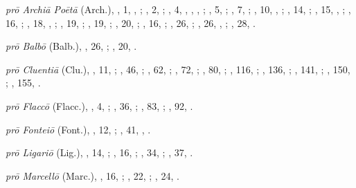 \begin{autindex}
  \subitem \emph{prō Archiā Poētā} (Arch.),
    ,  1, , ;
    ,  2, ;
    ,  4, , , , ;
    ,  5, ;
    ,  7, ;
    , 10, , ;
    , 14, ;
    , 15, , ;
    , 16, ;
    , 18, , ;
    , 19, ;
    , 19, ;
    , 20, ;
    , 16, ;
    , 26, ;
    , 26, , ;
    , 28, .

  \subitem \emph{prō Balbō} (Balb.),
    , 26, ;
    , 20, .

  \subitem \emph{prō Cluentiā} (Clu.),
    ,  11, ;
    ,  46, ;
    ,  62, ;
    ,  72, ;
    ,  80, ;
    , 116, ;
    , 136, ;
    , 141, ;
    , 150, ;
    , 155, .

  \subitem \emph{prō Flaccō} (Flacc.),
    ,  4, ;
    , 36, ;
    , 83, ;
    , 92, .

  \subitem \emph{prō Fonteiō} (Font.),
    , 12, ;
    , 41, , .

  \subitem \emph{prō Ligariō} (Lig.),
    , 14, ;
    , 16, ;
    , 34, ;
    , 37, .

  \subitem \emph{prō Marcellō} (Marc.),
    , 16, ;
    , 22, ;
    , 24, .


\end{autindex}
